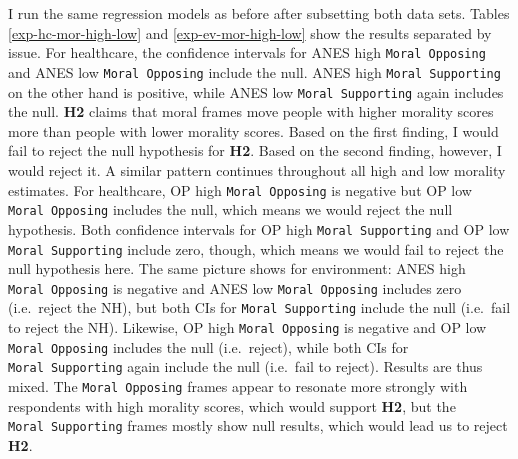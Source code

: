 \documentclass[12pt,econ]{sources/authesis}
\begin{document}
I run the same regression models as before after subsetting both data sets. Tables \ref{exp-hc-mor-high-low} and \ref{exp-ev-mor-high-low} show the results separated by issue. For healthcare, the confidence intervals for ANES high \texttt{Moral\ Opposing} and ANES low \texttt{Moral\ Opposing} include the null. ANES high \texttt{Moral\ Supporting} on the other hand is positive, while ANES low \texttt{Moral\ Supporting} again includes the null. \textbf{H2} claims that moral frames move people with higher morality scores more than people with lower morality scores. Based on the first finding, I would fail to reject the null hypothesis for \textbf{H2}. Based on the second finding, however, I would reject it. A similar pattern continues throughout all high and low morality estimates. For healthcare, OP high \texttt{Moral\ Opposing} is negative but OP low \texttt{Moral\ Opposing} includes the null, which means we would reject the null hypothesis. Both confidence intervals for OP high \texttt{Moral\ Supporting} and OP low \texttt{Moral\ Supporting} include zero, though, which means we would fail to reject the null hypothesis here. The same picture shows for environment: ANES high \texttt{Moral\ Opposing} is negative and ANES low \texttt{Moral\ Opposing} includes zero (i.e.~reject the NH), but both CIs for \texttt{Moral\ Supporting} include the null (i.e.~fail to reject the NH). Likewise, OP high \texttt{Moral\ Opposing} is negative and OP low \texttt{Moral\ Opposing} includes the null (i.e.~reject), while both CIs for \texttt{Moral\ Supporting} again include the null (i.e.~fail to reject). Results are thus mixed. The \texttt{Moral\ Opposing} frames appear to resonate more strongly with respondents with high morality scores, which would support \textbf{H2}, but the \texttt{Moral\ Supporting} frames mostly show null results, which would lead us to reject \textbf{H2}.

\ssp

\footnotesize
\end{document}
